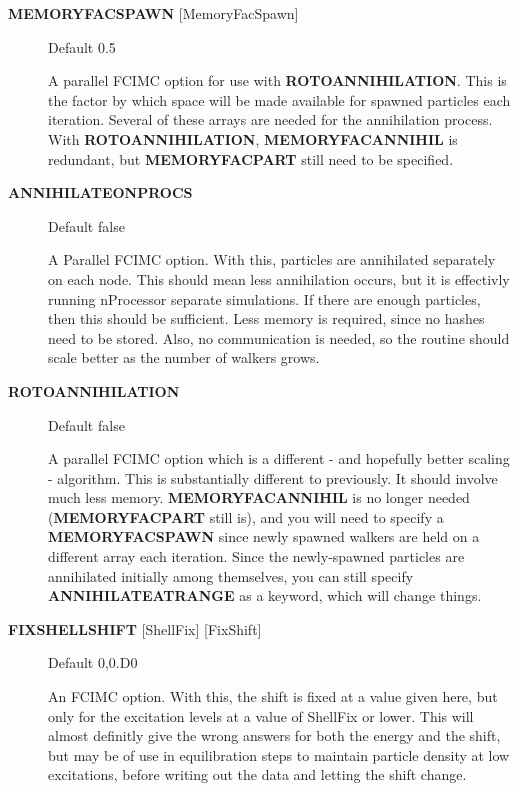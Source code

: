 \documentclass[openany,a4paper,10pt]{manual}
\begin{document}
\begin{description}
\item[\textbf{MEMORYFACSPAWN} {[}MemoryFacSpawn{]}]
Default 0.5

A parallel FCIMC option for use with \textbf{ROTOANNIHILATION}. This is the factor by which space will be made
available for spawned particles each iteration. Several of these arrays are needed for the annihilation
process. With \textbf{ROTOANNIHILATION}, \textbf{MEMORYFACANNIHIL} is redundant, but \textbf{MEMORYFACPART} still need to be specified.

\item[\textbf{ANNIHILATEONPROCS}]
Default false

A Parallel FCIMC option. With this, particles are annihilated separately on each node.
This should mean less annihilation occurs, but it is effectivly running nProcessor
separate simulations. If there are enough particles, then this should be sufficient.
Less memory is required, since no hashes need to be stored. Also, no communication is
needed, so the routine should scale better as the number of walkers grows.

\item[\textbf{ROTOANNIHILATION}]
Default false

A parallel FCIMC option which is a different - and hopefully better scaling - algorithm.
This is substantially different to previously. It should involve much less memory.
\textbf{MEMORYFACANNIHIL} is no longer needed (\textbf{MEMORYFACPART} still is), and you will need
to specify a \textbf{MEMORYFACSPAWN} since newly spawned walkers are held on a different array each iteration.
Since the newly-spawned particles are annihilated initially among themselves, you can still
specify \textbf{ANNIHILATEATRANGE} as a keyword, which will change things.

\item[\textbf{FIXSHELLSHIFT} {[}ShellFix{]} {[}FixShift{]}]
Default 0,0.D0

An FCIMC option. With this, the shift is fixed at a value given here,
but only for the excitation levels at a value of ShellFix or lower. This will
almost definitly give the wrong answers for both the energy and the shift,
but may be of use in equilibration steps to maintain particle density at
low excitations, before writing out the data and letting the shift change.

\end{description}
\end{document}
